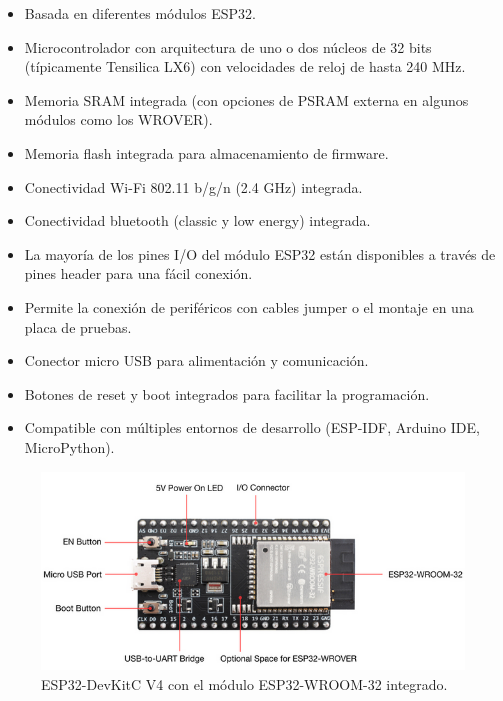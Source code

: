 \begin{itemize}
	\item Basada en diferentes módulos ESP32.
	\item Microcontrolador con arquitectura de uno o dos núcleos de 32 bits (típicamente Tensilica LX6) con velocidades de reloj de hasta 240 MHz.
	\item Memoria SRAM integrada (con opciones de PSRAM externa en algunos módulos como los WROVER).
	\item Memoria flash integrada para almacenamiento de firmware.
	\item Conectividad Wi-Fi 802.11 b/g/n (2.4 GHz) integrada.
	\item Conectividad bluetooth (classic y low energy) integrada.
	\item La mayoría de los pines I/O del módulo ESP32 están disponibles a través de pines header para una fácil conexión.
	\item Permite la conexión de periféricos con cables jumper o el montaje en una placa de pruebas.
	\item Conector micro USB para alimentación y comunicación.
	\item Botones de reset y boot integrados para facilitar la programación.
	\item Compatible con múltiples entornos de desarrollo (ESP-IDF, Arduino IDE, MicroPython).
\end{itemize}

\begin{figure}[h]
\centering
\includegraphics[scale=.5]{./Figures/devkit.png}
	\caption{ESP32-DevKitC V4 con el módulo ESP32-WROOM-32 integrado\protect\footnotemark.}
	\label{fig:devkit}
\end{figure}




